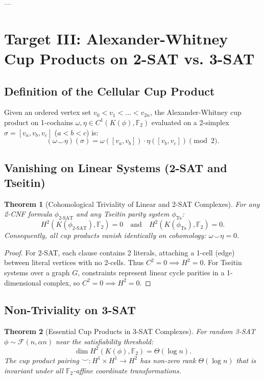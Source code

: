 \documentclass[11pt,a4paper]{article}
\theoremstyle{plain}
\newtheorem{theorem}{Theorem}[section]
\theoremstyle{definition}
\theoremstyle{remark}
\begin{document}
---

\section{Target III: Alexander-Whitney Cup Products on 2-SAT vs. 3-SAT}

\subsection{Definition of the Cellular Cup Product}

Given an ordered vertex set $v_0 < v_1 < \dots < v_{2n}$, the Alexander-Whitney cup product on 1-cochains $\omega, \eta \in C^1(K(\phi), \mathbb{F}_2)$ evaluated on a 2-simplex $\sigma = [v_a, v_b, v_c]$ ($a < b < c$) is:
\[
(\omega \smile \eta)(\sigma) = \omega([v_a, v_b]) \cdot \eta([v_b, v_c]) \pmod 2.
\]

\subsection{Vanishing on Linear Systems (2-SAT and Tseitin)}

\begin{theorem}[Cohomological Triviality of Linear and 2-SAT Complexes]
For any 2-CNF formula $\phi_{2\text{-SAT}}$ and any Tseitin parity system $\phi_{\mathrm{Ts}}$:
\[
H^2(K(\phi_{2\text{-SAT}}), \mathbb{F}_2) = 0 \quad \text{and} \quad H^2(K(\phi_{\mathrm{Ts}}), \mathbb{F}_2) = 0.
\]
Consequently, all cup products vanish identically on cohomology: $\omega \smile \eta = 0$.
\end{theorem}

\begin{proof}
For 2-SAT, each clause contains 2 literals, attaching a 1-cell (edge) between literal vertices with no 2-cells. Thus $C^2 = 0 \implies H^2 = 0$. For Tseitin systems over a graph $G$, constraints represent linear cycle parities in a 1-dimensional complex, so $C^2 = 0 \implies H^2 = 0$.
\end{proof}

\subsection{Non-Triviality on 3-SAT}

\begin{theorem}[Essential Cup Products in 3-SAT Complexes]\label{thm:cup_3sat}
For random 3-SAT $\phi \sim \mathcal{F}(n, \alpha n)$ near the satisfiability threshold:
\[
\dim H^2(K(\phi), \mathbb{F}_2) = \Theta(\log n).
\]
The cup product pairing $\smile: H^1 \times H^1 \to H^2$ has non-zero rank $\Theta(\log n)$ that is invariant under all $\mathbb{F}_2$-affine coordinate transformations.
\end{theorem}
\end{document}
